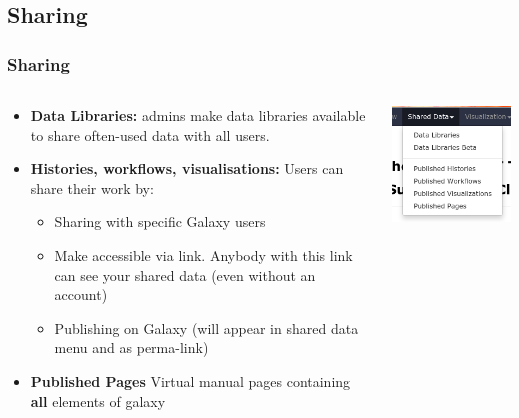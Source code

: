 \documentclass{beamer}              %
\begin{document}
\subsection{Sharing}
\begin{frame}
\frametitle{Sharing}
  \begin{columns}[T]
    \begin{column}{.72\textwidth}
	\begin{itemize}
	\item \textbf{Data Libraries: } admins make data libraries available to share often-used data with all users.
	\item \textbf{Histories, workflows, visualisations: } Users can share their work by:
		\begin{itemize}
		\item Sharing with specific Galaxy users
		\item Make accessible via link. Anybody with this link can see
	   your shared data (even without an account)
		\item Publishing on Galaxy (will appear in shared data menu and as perma-link)
		\end{itemize}
	\item \textbf{Published Pages} Virtual manual pages containing \textbf{all} elements of galaxy
	\end{itemize}
    \end{column}
    \begin{column}{.28\textwidth}
		\includegraphics[width=\textwidth,right]{figures/101p_07.png}
    \end{column}
  \end{columns}
\end{frame}
\end{document}
